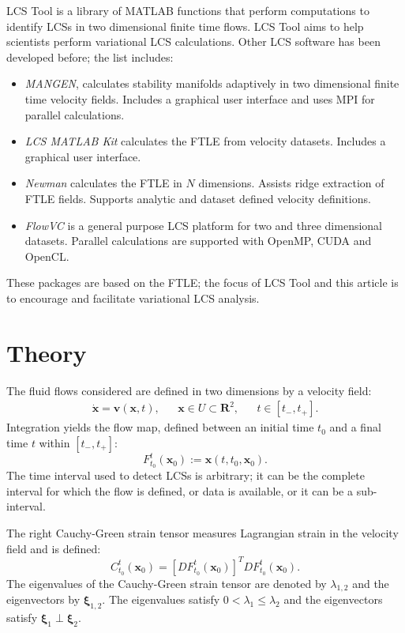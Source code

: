 \documentclass{article}
\newcommand{\reals}{\mathbf R}
\begin{document}
LCS Tool is a library of MATLAB functions that perform computations to identify LCSs in two dimensional finite time flows. LCS Tool aims to help scientists perform variational LCS calculations. Other LCS software has been developed before; the list includes:
\begin{itemize}
\item \emph{MANGEN}\parencite{lekien03:_time}, calculates stability manifolds adaptively in two dimensional finite time velocity fields. Includes a graphical user interface and uses MPI for parallel calculations.
\item \emph{LCS MATLAB Kit}\parencite{dabiri09:_lmk} calculates the FTLE from velocity datasets. Includes a graphical user interface.
\item \emph{Newman}\parencite{toit10:_trans} calculates the FTLE in $N$ dimensions. Assists ridge extraction of FTLE fields. Supports analytic and dataset defined velocity definitions.
\item \emph{FlowVC}\parencite{shadden10:_flowvc} is a general purpose LCS platform for two and three dimensional datasets. Parallel calculations are supported with Open\-MP, CUDA and OpenCL.
\end{itemize}
These packages are based on the FTLE; the focus of LCS Tool and this article is to encourage and facilitate variational LCS analysis.

\section{Theory}

The fluid flows considered are defined in two dimensions by a velocity field:
\begin{align*}
\dot{\boldsymbol x} = \boldsymbol v(\boldsymbol x,t), && \boldsymbol x \in U \subset \reals^2, && t \in [t_-,t_+].
\end{align*}
Integration yields the flow map, defined between an initial time $t_0$ and a final time $t$ within $[t_-,t_+]$:
\[
F_{t_0}^t(\boldsymbol x_0) := \boldsymbol x(t,t_0,\boldsymbol x_0).
\]
The time interval used to detect LCSs is arbitrary; it can be the complete interval for which the flow is defined, or data is available, or it can be a sub-interval.

The right Cauchy-Green strain tensor measures Lagrangian strain in the velocity field and is defined:
\[
C_{t_0}^t(\boldsymbol x_0) = \left[D F_{t_0}^t(\boldsymbol x_0)\right]^T D F_{t_0}^t(\boldsymbol x_0).
\]
The eigenvalues of the Cauchy-Green strain tensor are denoted by $\lambda_{1,2}$ and the eigenvectors by $\boldsymbol \xi_{1,2}$. The eigenvalues satisfy $0 < \lambda_1 \leq \lambda_2$ and the eigenvectors satisfy $\boldsymbol \xi_1 \perp \boldsymbol \xi_2$.
\end{document}
